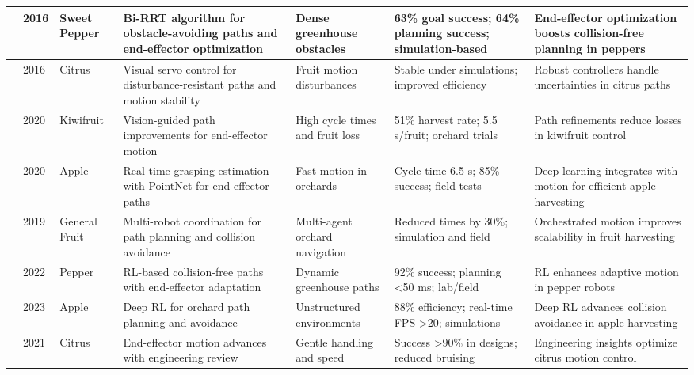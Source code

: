 \documentclass{ieeeaccess}
\begin{document}
\begin{table}[htbp]
\begin{tabular}{p{} p{} p{} p{} p{} p{} p{}}
\cite{bac2016analysis} & 2016 & Sweet Pepper & Bi-RRT algorithm for obstacle-avoiding paths and end-effector optimization & Dense greenhouse obstacles & 63\% goal success; 64\% planning success; simulation-based & End-effector optimization boosts collision-free planning in peppers \\ \midrule
\cite{mehta2016robust} & 2016 & Citrus & Visual servo control for disturbance-resistant paths and motion stability & Fruit motion disturbances & Stable under simulations; improved efficiency & Robust controllers handle uncertainties in citrus paths \\ \midrule
\cite{williams2020improvements} & 2020 & Kiwifruit & Vision-guided path improvements for end-effector motion & High cycle times and fruit loss & 51\% harvest rate; 5.5 s/fruit; orchard trials & Path refinements reduce losses in kiwifruit control \\ \midrule
\cite{kang2020real} & 2020 & Apple & Real-time grasping estimation with PointNet for end-effector paths  & Fast motion in orchards & Cycle time 6.5 s; 85\% success; field tests & Deep learning integrates with motion for efficient apple harvesting \\ \midrule
\cite{vougioukas2019orchestra} & 2019 & General Fruit & Multi-robot coordination for path planning and collision avoidance  & Multi-agent orchard navigation & Reduced times by 30\%; simulation and field & Orchestrated motion improves scalability in fruit harvesting \\ \midrule
\cite{verbiest2022path} & 2022 & Pepper & RL-based collision-free paths with end-effector adaptation  & Dynamic greenhouse paths & 92\% success; planning <50 ms; lab/field & RL enhances adaptive motion in pepper robots \\ \midrule
\cite{zhang2023deep} & 2023 & Apple & Deep RL for orchard path planning and avoidance & Unstructured environments & 88\% efficiency; real-time FPS >20; simulations & Deep RL advances collision avoidance in apple harvesting \\ \midrule
\cite{burks2021engineering} & 2021 & Citrus & End-effector motion advances with engineering review  & Gentle handling and speed & Success >90\% in designs; reduced bruising & Engineering insights optimize citrus motion control \\ 
\bottomrule
\end{tabular}
\end{table}
\end{document}

